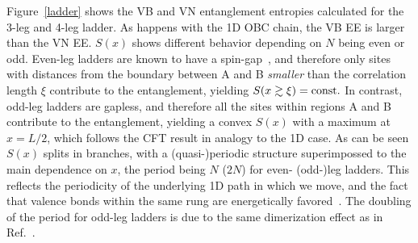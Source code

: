 \documentclass[prl,aps,twocolumn,floatfix,amsmath,amssymb,superscriptaddress,tightenlines]{revtex4}
\begin{document}
Figure~\ref{ladder} shows the VB and VN entanglement entropies calculated
for the 3-leg and 4-leg ladder. As happens with the 1D OBC chain, the VB
EE is larger than the VN EE.  $S(x)$ shows different behavior depending on
$N$ being even or odd.  Even-leg ladders are known to have a
spin-gap~\cite{White1994}, and therefore only sites with distances from
the boundary between A and B {\it smaller} than the correlation length
$\xi$ contribute to the entanglement, yielding $S(x\gtrsim \xi)= {\rm
const}.$ In contrast, odd-leg ladders are gapless, and therefore all the
sites within regions A and B contribute to the entanglement, yielding a
convex $S(x)$ with a maximum at $x=L/2$, which follows the CFT result in
analogy to the 1D case. As can be seen $S(x)$ splits in branches, with a
(quasi-)periodic structure superimpossed to the main dependence on $x$,
the period being $N$ ($2N$) for even- (odd-)leg ladders. This reflects the
periodicity of the underlying 1D path in which we move, and the fact that
valence bonds within the same rung are energetically
favored~\cite{White1994}. The doubling of the period for odd-leg ladders
is due to the same dimerization effect as in Ref.~\cite{Ian1}.

 
\end{document}

